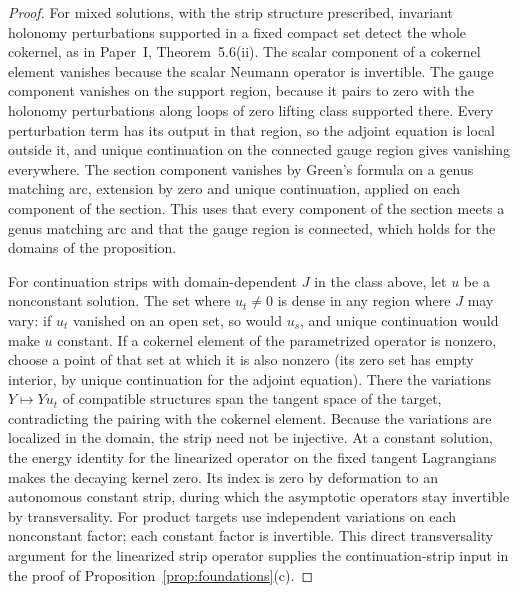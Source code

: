 \documentclass[11pt]{amsart}
\theoremstyle{definition}
\theoremstyle{remark}
\theoremstyle{plain}
\numberwithin{equation}{section}
\begin{document}
\begin{proof}
For mixed solutions, with the strip structure prescribed, invariant
holonomy perturbations supported in a fixed compact set detect the
whole cokernel, as in Paper~I, Theorem~5.6(ii). The scalar component of a cokernel
element vanishes because the scalar Neumann operator is invertible.
The gauge component vanishes on the support region, because it pairs to zero with the holonomy perturbations along loops of zero lifting class supported there. Every perturbation term has its output in that region, so the adjoint equation is local outside it, and unique continuation on the connected gauge region gives vanishing everywhere. The section
component vanishes by Green's formula on a genus matching arc,
extension by zero and unique continuation, applied on each component
of the section. This uses that every component of the section meets a
genus matching arc and that the gauge region is connected, which holds
for the domains of the proposition.

For continuation strips with domain-dependent $J$ in the class above,
let $u$ be a nonconstant solution. The set where $u_t\neq0$ is dense in
any region where $J$ may vary: if $u_t$ vanished on an open set, so
would $u_s$, and unique continuation would make $u$ constant. If a
cokernel element of the parametrized operator is nonzero, choose a point of that set at which it is also nonzero (its zero set has empty interior, by unique continuation for the adjoint equation). There the variations
$Y\mapsto Yu_t$ of compatible structures span the tangent space of the
target, contradicting the pairing with the cokernel element. Because
the variations are localized in the domain, the strip need not be
injective. At a constant solution, the energy identity for the
linearized operator on the fixed tangent Lagrangians makes the
decaying kernel zero. Its index is zero by deformation to an
autonomous constant strip, during which the asymptotic operators stay
invertible by transversality. For product targets use independent
variations on each nonconstant factor; each constant factor is
invertible. This direct transversality argument for the linearized
strip operator supplies the continuation-strip input in the proof of
Proposition~\ref{prop:foundations}(c).


\end{proof}
\end{document}
